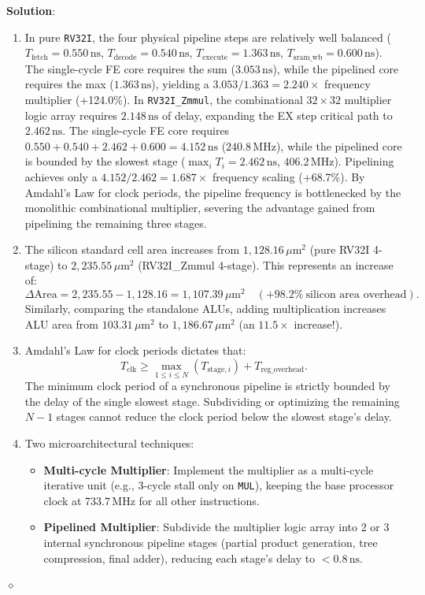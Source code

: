 \begin{problem}
\textbf{Solution}:
\begin{enumerate}
    \item In pure \texttt{RV32I}, the four physical pipeline steps are relatively well balanced ($T_{\text{fetch}} = 0.550\,\text{ns}$, $T_{\text{decode}} = 0.540\,\text{ns}$, $T_{\text{execute}} = 1.363\,\text{ns}$, $T_{\text{sram\_wb}} = 0.600\,\text{ns}$). The single-cycle FE core requires the sum ($3.053\,\text{ns}$), while the pipelined core requires the max ($1.363\,\text{ns}$), yielding a $3.053 / 1.363 = 2.240\times$ frequency multiplier (+124.0\%). In \texttt{RV32I\_Zmmul}, the combinational $32 \times 32$ multiplier logic array requires $2.148\,\text{ns}$ of delay, expanding the EX step critical path to $2.462\,\text{ns}$. The single-cycle FE core requires $0.550 + 0.540 + 2.462 + 0.600 = 4.152\,\text{ns}$ ($240.8\,\text{MHz}$), while the pipelined core is bounded by the slowest stage ($\max_i T_i = 2.462\,\text{ns}$, $406.2\,\text{MHz}$). Pipelining achieves only a $4.152 / 2.462 = 1.687\times$ frequency scaling (+68.7\%). By Amdahl's Law for clock periods, the pipeline frequency is bottlenecked by the monolithic combinational multiplier, severing the advantage gained from pipelining the remaining three stages.
    \item The silicon standard cell area increases from $1,128.16\,\mu\text{m}^2$ (pure RV32I 4-stage) to $2,235.55\,\mu\text{m}^2$ (RV32I\_Zmmul 4-stage). This represents an increase of:
    \begin{equation}
    \Delta \text{Area} = 2,235.55 - 1,128.16 = 1,107.39\,\mu\text{m}^2 \quad (+98.2\% \ \text{silicon area overhead}).
    \end{equation}
    Similarly, comparing the standalone ALUs, adding multiplication increases ALU area from $103.31\,\mu\text{m}^2$ to $1,186.67\,\mu\text{m}^2$ (an $11.5\times$ increase!).
    \item Amdahl's Law for clock periods dictates that:
    \begin{equation}
    T_{\text{clk}} \ge \max_{1 \le i \le N} (T_{\text{stage}, i}) + T_{\text{reg\_overhead}}.
    \end{equation}
    The minimum clock period of a synchronous pipeline is strictly bounded by the delay of the single slowest stage. Subdividing or optimizing the remaining $N-1$ stages cannot reduce the clock period below the slowest stage's delay.
    \item Two microarchitectural techniques:
    \begin{itemize}
        \item \textbf{Multi-cycle Multiplier}: Implement the multiplier as a multi-cycle iterative unit (e.g., 3-cycle stall only on \texttt{MUL}), keeping the base processor clock at $733.7\,\text{MHz}$ for all other instructions.
        \item \textbf{Pipelined Multiplier}: Subdivide the multiplier logic array into 2 or 3 internal synchronous pipeline stages (partial product generation, tree compression, final adder), reducing each stage's delay to $<0.8\,\text{ns}$.
    \end{itemize}
\end{enumerate}
$\diamond$
\end{problem}

